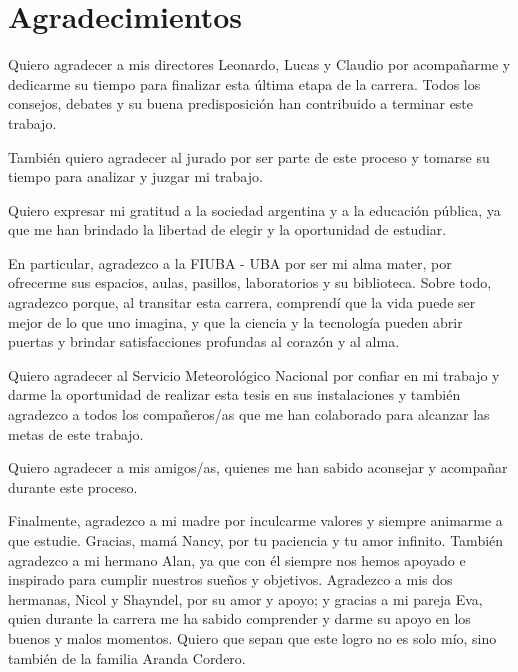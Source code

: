 \chapter*{Agradecimientos}

Quiero agradecer a mis directores Leonardo, Lucas y Claudio por acompañarme y dedicarme su tiempo para finalizar esta última etapa de la carrera. Todos los consejos, debates y su buena predisposición han contribuido a terminar este trabajo.

También quiero agradecer al jurado por ser parte de este proceso y tomarse su tiempo para analizar y juzgar mi trabajo.

Quiero expresar mi gratitud a la sociedad argentina y a la educación pública, ya que me han brindado la libertad de elegir y la oportunidad de estudiar.

En particular, agradezco a la FIUBA - UBA por ser mi alma mater, por ofrecerme sus espacios, aulas, pasillos, laboratorios y su biblioteca. Sobre todo, agradezco porque, al transitar esta carrera, comprendí que la vida puede ser mejor de lo que uno imagina, y que la ciencia y la tecnología pueden abrir puertas y brindar satisfacciones profundas al corazón y al alma.

Quiero agradecer al Servicio Meteorológico Nacional por confiar en mi trabajo y darme la oportunidad de realizar esta tesis en sus instalaciones y también agradezco a todos los compañeros/as que me han colaborado para alcanzar las metas de este trabajo.

Quiero agradecer a mis amigos/as, quienes me han sabido aconsejar y acompañar durante este proceso.

Finalmente, agradezco a mi madre por inculcarme valores y siempre animarme a que estudie. Gracias, mamá Nancy, por tu paciencia y tu amor infinito. También agradezco a mi hermano Alan, ya que con él siempre nos hemos apoyado e inspirado para cumplir nuestros sueños y objetivos. Agradezco a mis dos hermanas, Nicol y Shayndel, por su amor y apoyo; y gracias a mi pareja Eva, quien durante la carrera me ha sabido comprender y darme su apoyo en los buenos y malos momentos. Quiero que sepan que este logro no es solo mío, sino también de la familia Aranda Cordero.